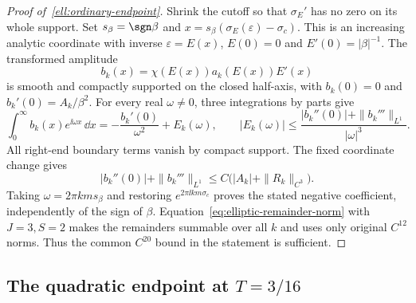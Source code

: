 \begin{proof}[Proof of~\eqref{ell:ordinary-endpoint}]
Shrink the cutoff so that $\sigma_E'$ has no zero on its whole support.
Set $s_\beta=\sgn\beta$ and
$x=s_\beta(\sigma_E(\varepsilon)-\sigma_c)$.  This is an increasing
analytic coordinate with inverse $\varepsilon=E(x)$,
$E(0)=0$ and $E'(0)=|\beta|^{-1}$.  The transformed amplitude
\[
 b_k(x)=\chi(E(x))a_k(E(x))E'(x)
\]
is smooth and compactly supported on the closed half-axis, with
$b_k(0)=0$ and $b_k'(0)=A_k/\beta^2$.  For every real $\omega\ne0$,
three integrations by parts give
\begin{equation}\label{ell:three-ibp}
 \int_0^\infty b_k(x)e^{\ii\omega x}\,\dd x
 =-\frac{b_k'(0)}{\omega^2}+E_k(\omega),\qquad
 |E_k(\omega)|\leq
 \frac{|b_k''(0)|+\|b_k'''\|_{L^1}}{|\omega|^3}.
\end{equation}
All right-end boundary terms vanish by compact support.  The fixed
coordinate change gives
\[
 |b_k''(0)|+\|b_k'''\|_{L^1}
 \leq C\bigl(|A_k|+\|R_k\|_{C^3}\bigr).
\]
Taking $\omega=2\pi km s_\beta$ and restoring
$e^{2\pi\ii km\sigma_c}$ proves the stated negative coefficient,
independently of the sign of $\beta$.
Equation~\eqref{eq:elliptic-remainder-norm} with $J=3,S=2$ makes the
remainders summable over all $k$ and uses only original $C^{12}$ norms.
Thus the common $C^{20}$ bound in the statement is sufficient.
\end{proof}

\subsection{The quadratic endpoint at \texorpdfstring{$T=3/16$}{T=3/16}}

